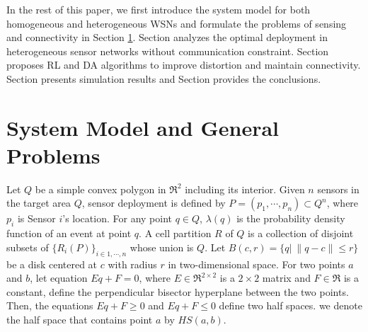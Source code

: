 \documentclass[journal,draftcls,onecolumn,12pt,twoside, narroweqnarray]{IEEEtran}
\begin{document}
In the rest of this paper, we first introduce the system model for both homogeneous and heterogeneous WSNs and formulate the problems of sensing and connectivity in Section \ref{sec:model}. Section \uppercase\expandafter{} analyzes the optimal deployment in heterogeneous sensor networks without communication constraint. Section \uppercase\expandafter{} proposes RL and DA algorithms to improve distortion and maintain connectivity. Section \uppercase\expandafter{} presents simulation results and
Section \uppercase\expandafter{} provides the conclusions.





\section{System Model and General Problems}\label{sec:model}
Let $Q$ be a simple convex polygon in $\Re^{2}$ including its interior. Given $n$ sensors in the target area $Q$, sensor deployment is defined by $P=(p_1,\cdots,p_n) \subset Q^{n}$, where $p_i$ is Sensor $i$'s location. For any point $q \in Q$, $\lambda(q)$ is the probability density function of an event at point $q$. A cell partition $R$ of $Q$ is a collection of disjoint subsets of $\{R_i(P)\}_{i\in{1,\cdots,n}}$ whose union is $Q$. Let $B(c,r)=\{q|\ \|q-c\|\le r\}$ be a disk centered at $c$ with radius $r$ in two-dimensional space. For two points $a$ and $b$, let equation $Eq+F=0$, where $E\in \Re^{2\times2}$ is a $2\times2$ matrix and $F\in \Re$ is a constant, define the perpendicular bisector hyperplane between the two points. Then, the equations $Eq+F\ge0$ and $Eq+F\leq 0$ define two half spaces. we denote the half space that contains point $a$ by $HS(a,b)$.
\end{document}
